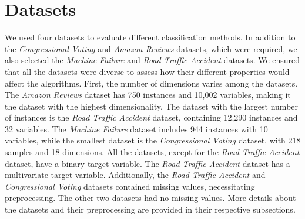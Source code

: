 \documentclass{article}
\begin{document}
\section{Datasets}
We used four datasets to evaluate different classification methods. In addition to the \textit{Congressional Voting} and \textit{Amazon Reviews} datasets, which were required, we also selected the \textit{Machine Failure} and \textit{Road Traffic Accident} datasets. We ensured that all the datasets were diverse to assess how their different properties would affect the algorithms. \newline
First, the number of dimensions varies among the datasets. The \textit{Amazon Reviews} dataset has 750 instances and 10,002 variables, making it the dataset with the highest dimensionality. The dataset with the largest number of instances is the \textit{Road Traffic Accident} dataset, containing 12,290 instances and 32 variables. The \textit{Machine Failure} dataset includes 944 instances with 10 variables, while the smallest dataset is the \textit{Congressional Voting} dataset, with 218 samples and 18 dimensions.\newline
All the datasets, except for the \textit{Road Traffic Accident} dataset, have a binary target variable. The \textit{Road Traffic Accident} dataset has a multivariate target variable. Additionally, the \textit{Road Traffic Accident} and \textit{Congressional Voting} datasets contained missing values, necessitating preprocessing. The other two datasets had no missing values.\newline
More details about the datasets and their preprocessing are provided in their respective subsections.
\end{document}
